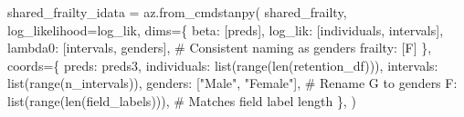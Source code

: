 \documentclass[
  letterpaper,
  DIV=11,
  numbers=noendperiod]{scrartcl}
\newenvironment{Shaded}{\begin{snugshade}}{\end{snugshade}}
\newcommand{\BuiltInTok}[1]{\textcolor[rgb]{0.00,0.23,0.31}{#1}}
\newcommand{\CommentTok}[1]{\textcolor[rgb]{0.37,0.37,0.37}{#1}}
\newcommand{\NormalTok}[1]{\textcolor[rgb]{0.00,0.23,0.31}{#1}}
\newcommand{\OperatorTok}[1]{\textcolor[rgb]{0.37,0.37,0.37}{#1}}
\newcommand{\StringTok}[1]{\textcolor[rgb]{0.13,0.47,0.30}{#1}}
\begin{document}
\begin{Shaded}
\begin{Highlighting}[]
\NormalTok{shared\_frailty\_idata }\OperatorTok{=}\NormalTok{ az.from\_cmdstanpy(}
\NormalTok{    shared\_frailty,}
\NormalTok{    log\_likelihood}\OperatorTok{=}\StringTok{\textquotesingle{}log\_lik\textquotesingle{}}\NormalTok{,}
\NormalTok{    dims}\OperatorTok{=}\NormalTok{\{}
        \StringTok{\textquotesingle{}beta\textquotesingle{}}\NormalTok{: [}\StringTok{\textquotesingle{}preds\textquotesingle{}}\NormalTok{], }
        \StringTok{\textquotesingle{}log\_lik\textquotesingle{}}\NormalTok{: [}\StringTok{\textquotesingle{}individuals\textquotesingle{}}\NormalTok{, }\StringTok{\textquotesingle{}intervals\textquotesingle{}}\NormalTok{], }
        \StringTok{\textquotesingle{}lambda0\textquotesingle{}}\NormalTok{: [}\StringTok{\textquotesingle{}intervals\textquotesingle{}}\NormalTok{, }\StringTok{\textquotesingle{}genders\textquotesingle{}}\NormalTok{],  }\CommentTok{\# Consistent naming as \textquotesingle{}genders\textquotesingle{}}
        \StringTok{\textquotesingle{}frailty\textquotesingle{}}\NormalTok{: [}\StringTok{\textquotesingle{}F\textquotesingle{}}\NormalTok{]}
\NormalTok{    \},}
\NormalTok{    coords}\OperatorTok{=}\NormalTok{\{}
        \StringTok{\textquotesingle{}preds\textquotesingle{}}\NormalTok{: preds3,  }
        \StringTok{\textquotesingle{}individuals\textquotesingle{}}\NormalTok{: }\BuiltInTok{list}\NormalTok{(}\BuiltInTok{range}\NormalTok{(}\BuiltInTok{len}\NormalTok{(retention\_df))), }
        \StringTok{\textquotesingle{}intervals\textquotesingle{}}\NormalTok{: }\BuiltInTok{list}\NormalTok{(}\BuiltInTok{range}\NormalTok{(n\_intervals)),  }
        \StringTok{\textquotesingle{}genders\textquotesingle{}}\NormalTok{: [}\StringTok{"Male"}\NormalTok{, }\StringTok{"Female"}\NormalTok{],  }\CommentTok{\# Rename \textquotesingle{}G\textquotesingle{} to \textquotesingle{}genders\textquotesingle{}}
        \StringTok{\textquotesingle{}F\textquotesingle{}}\NormalTok{: }\BuiltInTok{list}\NormalTok{(}\BuiltInTok{range}\NormalTok{(}\BuiltInTok{len}\NormalTok{(field\_labels))),  }\CommentTok{\# Matches field label length}
\NormalTok{    \},}
\NormalTok{)}
\end{Highlighting}
\end{Shaded}
\end{document}
